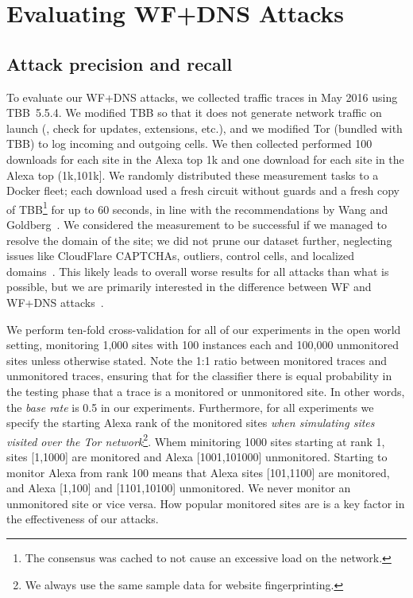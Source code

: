 \section{Evaluating WF+DNS Attacks}
\label{sec:analysis}

\subsection{Attack precision and recall}

To evaluate our WF+DNS attacks, we collected traffic traces in May
2016 using TBB~5.5.4.
We modified TBB so that it does not generate network traffic on launch
(\ie, check for
updates, extensions, etc.), and we modified 
Tor (bundled with TBB) to log incoming and outgoing cells.
We then collected performed 100 downloads for each site in the Alexa top
1k and one download for each site in the 
Alexa top (1k,101k]. We randomly distributed these measurement tasks
to a Docker fleet; each download used a fresh circuit without
guards and a fresh copy of TBB\footnote{The consensus was cached to not
cause an excessive load on the network.} for up to 60 seconds,
in line with the recommendations by Wang and Goldberg~\cite{Wang2013a}.
We considered the measurement to be successful if we managed to resolve
the domain of the site; 
we did not prune our dataset further, neglecting issues like CloudFlare
CAPTCHAs, outliers, control cells, and localized domains~\cite{Juarez2014a}.
This likely leads to overall worse results for all attacks than what is
possible, but we are primarily interested in the difference between WF and
WF+DNS attacks~\cite{Wang2013a}.

We perform ten-fold cross-validation for all of our experiments in the open
world setting, monitoring 1,000 sites with 100 instances each and
100,000 unmonitored sites unless otherwise stated.
Note the 1:1 ratio between monitored traces and unmonitored traces,
ensuring that for the classifier there is equal probability in the testing
phase that a trace is a monitored or unmonitored site.
In other words, the \emph{base rate} is 0.5 in our experiments.
Furthermore, for all experiments we specify the starting Alexa rank of the
monitored sites
\emph{when simulating sites visited over the Tor network}\footnote{We always
use the same sample data for website fingerprinting.}.
Whem minitoring 1000 sites starting at rank 1, sites
[1,1000] are monitored and Alexa [1001,101000] unmonitored. Starting to
monitor Alexa from rank 100 means that Alexa sites [101,1100] are monitored,
and Alexa [1,100] and [1101,10100] unmonitored.
We never monitor an unmonitored site or vice versa.
How popular monitored sites
are is a key factor in the effectiveness of our attacks.

